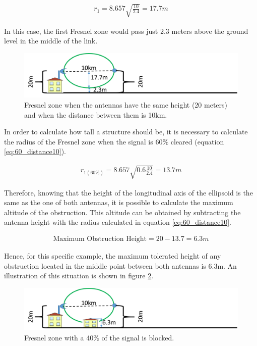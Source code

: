 \begin{align}
r_1 = 8.657\sqrt{\frac{10}{2.4}} = 17.7m\label{eq:100_distance10}
\end{align}

In this case, the first Fresnel zone would pass just 2.3 meters above the ground level in the middle of the link. 

\begin{figure}[H]
	\centering
	\includegraphics[scale=0.50]{figures/fresnel_10km_height.png}
	\caption{Fresnel zone when the antennas have the same height (20 meters) and when the distance between them is 10km.}
	\label{fig:fresnel_zones_10km_height}
\end{figure}  

In order to calculate how tall a structure should be, it is necessary to calculate the radius of the Fresnel zone when the signal is 60$\%$ cleared (equation \ref{eq:60_distance10}).

\begin{align}
r_{1(60\%)} = 8.657\sqrt{0.6 \frac{10}{2.4}} = 13.7m\label{eq:60_distance10}
\end{align}
  
Therefore, knowing that the height of the longitudinal axis of the ellipsoid is the same as the one of both antennas, it is possible to calculate the maximum altitude of the obstruction. This altitude can be obtained by subtracting the antenna height with the radius calculated in equation \ref{eq:60_distance10}.

\begin{align}
\text{Maximum Obstruction Height} = 20 - 13.7 = 6.3m\label{eq:height_obstruction}
\end{align}

Hence, for this specific example, the maximum tolerated height of any obstruction located in the middle point between both antennas is 6.3m. An illustration of this situation is shown in figure \ref{fig:fresnel_zones_10km_60procent}.

\begin{figure}[H]
	\centering
	\includegraphics[scale=0.50]{figures/fresnel_10km_60procent.png}
	\caption{Fresnel zone with a 40$\%$ of the signal is blocked.}
	\label{fig:fresnel_zones_10km_60procent}
\end{figure}  


